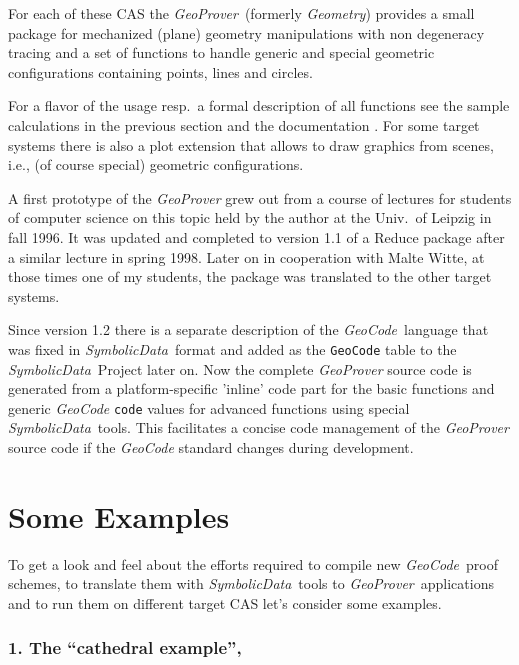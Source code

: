 \documentclass[11pt]{article}
\newcommand{\GC}{\textit{Geo\-Code}}
\newcommand{\GP}{\textit{Geo\-Prover}}
\newcommand{\SD}{\textit{Symbolic\-Data}}
\begin{document}
For each of these CAS the \GP\ (formerly {\it Geometry\/}) provides a small
package for mechanized (plane) geometry manipulations with non degeneracy
tracing and a set of functions to handle generic and special geometric
configurations containing points, lines and circles.

For a flavor of the usage resp.\ a formal description of all functions see
the sample calculations in the previous section and the documentation
\cite{GeoProver}.  For some target systems there is also a plot extension that
allows to draw graphics from scenes, i.e., (of course special) geometric
configurations.

A first prototype of the {\GP} grew out from a course of lectures for students
of computer science on this topic held by the author at the Univ.\ of Leipzig
in fall 1996. It was updated and completed to version 1.1 of a Reduce package
after a similar lecture in spring 1998.  Later on in cooperation with Malte
Witte, at those times one of my students, the package was translated to the
other target systems.

Since version 1.2 there is a separate description of the \GC\ language that
was fixed in \SD\ format and added as the {\tt GeoCode} table to the \SD\ 
Project later on.  Now the complete {\GP} source code is generated from a
platform-specific 'inline' code part for the basic functions and generic {\GC}
{\tt code} values for advanced functions using special \SD\ tools.  This
facilitates a concise code management of the {\GP} source code if the {\GC}
standard changes during development.

\section{Some Examples}

To get a look and feel about the efforts required to compile new \GC\ proof
schemes, to translate them with \SD\ tools to \GP\ applications and to run
them on different target CAS let's consider some examples.

\subsubsection*{1. The ``cathedral example'', \cite[5.3]{Kapur_97a}} 
\end{document}
